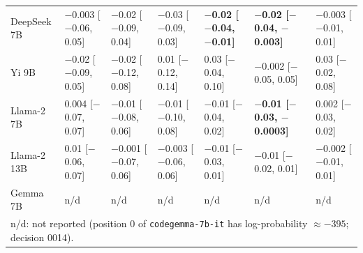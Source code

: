 \begin{tabular}{lllllll}
DeepSeek 7B & $-$0.003 [$-$0.06, 0.05] & $-$0.02 [$-$0.09, 0.04] & $-$0.03 [$-$0.09, 0.03] & \textbf{$-$0.02 [$-$0.04, $-$0.01]} & \textbf{$-$0.02 [$-$0.04, $-$0.003]} & $-$0.003 [$-$0.01, 0.01] \\
Yi 9B & $-$0.02 [$-$0.09, 0.05] & $-$0.02 [$-$0.12, 0.08] & 0.01 [$-$0.12, 0.14] & 0.03 [$-$0.04, 0.10] & $-$0.002 [$-$0.05, 0.05] & 0.03 [$-$0.02, 0.08] \\
Llama-2 7B & 0.004 [$-$0.07, 0.07] & $-$0.01 [$-$0.08, 0.06] & $-$0.01 [$-$0.10, 0.08] & $-$0.01 [$-$0.04, 0.02] & \textbf{$-$0.01 [$-$0.03, $-$0.0003]} & 0.002 [$-$0.03, 0.02] \\
Llama-2 13B & 0.01 [$-$0.06, 0.07] & $-$0.001 [$-$0.07, 0.06] & $-$0.003 [$-$0.06, 0.06] & $-$0.01 [$-$0.03, 0.01] & $-$0.01 [$-$0.02, 0.01] & $-$0.002 [$-$0.01, 0.01] \\
Gemma 7B & n/d & n/d & n/d & n/d & n/d & n/d \\
\multicolumn{7}{l}{\footnotesize n/d: not reported (position 0 of \texttt{codegemma-7b-it} has log-probability $\approx -395$; decision 0014).} \\
\bottomrule
\end{tabular}
